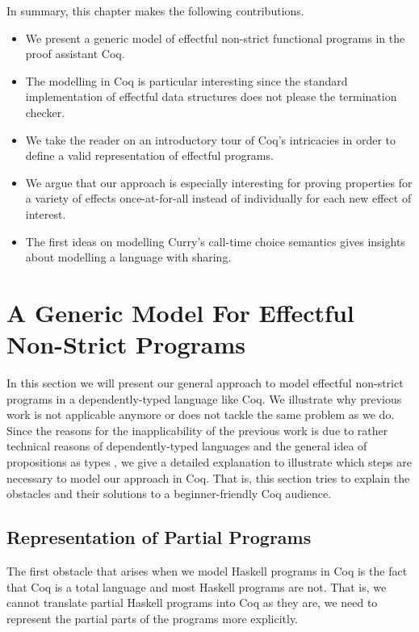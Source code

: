 In summary, this chapter makes the following contributions.

\begin{itemize}
\item We present a generic model of effectful non-strict functional
  programs in the proof assistant Coq.
\item The modelling in Coq is particular interesting since the
  standard implementation of effectful data structures does not please
  the termination checker.
\item We take the reader on an introductory tour of Coq's intricacies in
order to define a valid representation of effectful programs.
\item We argue that our approach is especially interesting for proving
  properties for a variety of effects once-at-for-all instead of
  individually for each new effect of interest.
\item The first ideas on modelling Curry's call-time choice semantics
  gives insights about modelling a language with sharing.
\end{itemize}
 
\section{A Generic Model For Effectful Non-Strict Programs}

In this section we will present our general approach to model
effectful non-strict programs in a dependently-typed language like
Coq.
We illustrate why previous work is not applicable anymore or does not
tackle the same problem as we do.
Since the reasons for the inapplicability of the previous work is due
to rather technical reasons of dependently-typed languages and the
general idea of propositions as types \citep{wadler2015propositions},
we give a detailed explanation to illustrate which steps are necessary
to model our approach in Coq.
That is, this section tries to explain the obstacles and their
solutions to a beginner-friendly Coq audience.

\subsection{Representation of Partial Programs}
\label{subsec:partial}
The first obstacle that arises when we model Haskell programs in Coq
is the fact that Coq is a total language and most Haskell programs are
not.
That is, we cannot translate partial Haskell programs into Coq as they
are, we need to represent the partial parts of the programs more
explicitly.

